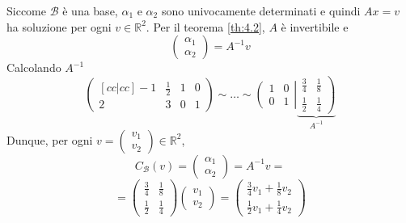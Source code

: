 \documentclass[a4paper]{article}
\theoremstyle{break}
\theoremstyle{break}
\theoremstyle{break}
\theoremstyle{break}
\begin{document}
\begin{example}
\[  \] 
  Siccome \( \mathcal{B} \) è una base, \( \alpha_1 \) e \( \alpha_2 \) sono univocamente
  determinati e quindi \( Ax = v \) ha soluzione per ogni \( v \in \mathbb{R}^2 \).
  Per il teorema \ref{th:4.2}, \( A \) è invertibile e
  \[
  \begin{pmatrix} 
    \alpha_1\\
    \alpha_2
  \end{pmatrix} 
  = A^{-1}v
  \] 
  Calcolando \( A^{-1} \) 
  \[
    \begin{pmatrix}[cc|cc]
      -1 & \frac{1}{2} & 1 & 0\\
      2 & 3 & 0 & 1
  \end{pmatrix} 
  \sim
  \ldots
  \sim
  \left(
  \begin{array}{cc}
    1 & 0\\
    0 & 1
  \end{array}
  \right|
  \underbrace{
    \left.
      \begin{array}{cc}
        \frac{3}{4} & \frac{1}{8}\\
        \frac{1}{2} & \frac{1}{4}
      \end{array}
    \right)
  }_{A^{-1}}
  \] 
  Dunque, per ogni \( v = \begin{pmatrix} v_1\\v_2 \end{pmatrix} \in \mathbb{R}^2 \),
  \[
    C_{\mathcal{B}}(v) = \begin{pmatrix} \alpha_1\\\alpha_2 \end{pmatrix} =
    A^{-1}v =
  \] 
  \[
    =
    \begin{pmatrix} 
      \frac{3}{4} & \frac{1}{8}\\
      \frac{1}{2} & \frac{1}{4}
    \end{pmatrix} 
    \begin{pmatrix} v_1\\v_2 \end{pmatrix} 
    =
    \begin{pmatrix} 
      \frac{3}{4}v_1 + \frac{1}{8}v_2\\
      \frac{1}{2}v_1 + \frac{1}{4}v_2
    \end{pmatrix} 
  \] 
\end{example}
\end{document}
